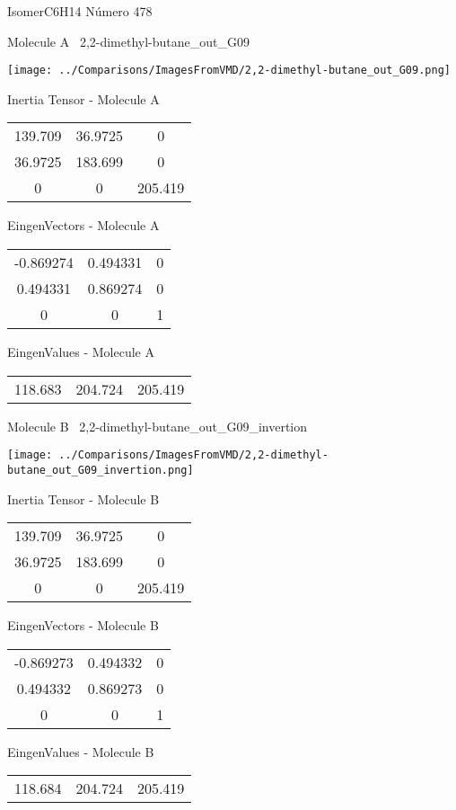 \vtab[-3cm]
\begin{center}
{\large IsomerC6H14 \tab Número 478}
\end{center}
\begin{multicols}{2}
\begin{center}

Molecule A \
2,2-dimethyl-butane\_out\_G09

\texttt{[image: ../Comparisons/ImagesFromVMD/2,2-dimethyl-butane\_out\_G09.png]}

Inertia Tensor - Molecule A \\
\begin{tabular}{|c c c|}
139.709	 & 	36.9725	 & 	0	 \\
36.9725	 & 	183.699	 & 	0	 \\
0	 & 	0	 & 	205.419
\end{tabular}

\vtab
 EingenVectors - Molecule A     \\
\begin{tabular}{|c c c|}
-0.869274	 & 	0.494331	 & 	0	 \\
0.494331	 & 	0.869274	 & 	0	 \\
0	 & 	0	 & 	1
\end{tabular}

\vtab
 EingenValues - Molecule A     \\
\begin{tabular}{|c c c|}
118.683	 & 	204.724	 & 	205.419	 \\
\end{tabular}
\columnbreak

Molecule B \
2,2-dimethyl-butane\_out\_G09\_invertion

\texttt{[image: ../Comparisons/ImagesFromVMD/2,2-dimethyl-butane\_out\_G09\_invertion.png]}

Inertia Tensor - Molecule B \\
\begin{tabular}{|c c c|}
139.709	 & 	36.9725	 & 	0	 \\
36.9725	 & 	183.699	 & 	0	 \\
0	 & 	0	 & 	205.419
\end{tabular}

\vtab
 EingenVectors - Molecule B     \\
\begin{tabular}{|c c c|}
-0.869273	 & 	0.494332	 & 	0	 \\
0.494332	 & 	0.869273	 & 	0	 \\
0	 & 	0	 & 	1
\end{tabular}

\vtab
 EingenValues - Molecule B     \\
\begin{tabular}{|c c c|}
118.684	 & 	204.724	 & 	205.419	 \\
\end{tabular}

\end{center}
\end{multicols}

